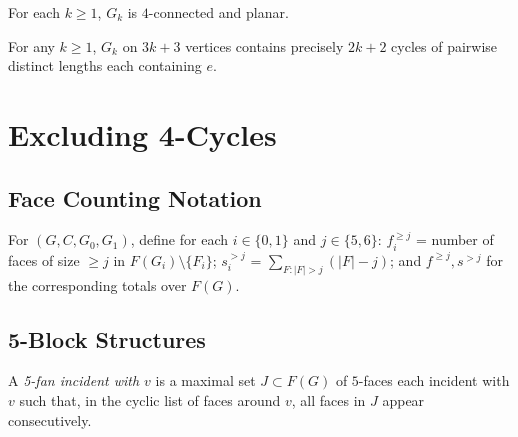 \begin{lemma}
  \label{lem:gk_properties}
  \notready
  For each $k \ge 1$, $G_k$ is $4$-connected and planar.
\end{lemma}

\begin{theorem}
  \label{thm:tightness}
  \notready
  For any $k \ge 1$, $G_k$ on $3k+3$ vertices contains precisely $2k+2$
  cycles of pairwise distinct lengths each containing $e$.
\end{theorem}

\chapter{Excluding 4-Cycles}

\section{Face Counting Notation}

\begin{definition}
  \label{def:face_counts}
  \notready
  For $(G, C, G_0, G_1)$, define for each $i \in \{0,1\}$ and
  $j \in \{5, 6\}$:
  $f_i^{\ge j}$ = number of faces of size $\ge j$ in $F(G_i) \setminus \{F_i\}$;
  $s_i^{>j}$ = $\sum_{F : |F| > j} (|F| - j)$;
  and $f^{\ge j}, s^{>j}$ for the corresponding totals over $F(G)$.
\end{definition}

\section{5-Block Structures}

\begin{definition}[5-fan]
  \label{def:five_fan}
  \notready
  A \emph{5-fan incident with $v$} is a maximal set $J \subset F(G)$ of
  $5$-faces each incident with $v$ such that, in the cyclic list of faces
  around $v$, all faces in $J$ appear consecutively.
\end{definition}

